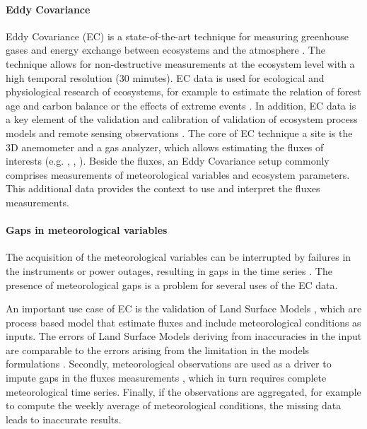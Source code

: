 \documentclass{article}
\begin{document}
\paragraph{Eddy Covariance} Eddy Covariance (EC) is a state-of-the-art technique for measuring greenhouse gases and energy exchange between ecosystems and the atmosphere \cite{aubinet_eddy_2012-1}.  The technique allows for non-destructive measurements at the ecosystem level with a high temporal resolution (30 minutes). EC data is used for ecological and physiological research of ecosystems, for example to estimate the relation of forest age and carbon balance \cite{besnard_quantifying_2018} or the effects of extreme events \cite{mahecha_detecting_2017}. In addition, EC data is a key element of the validation and calibration of validation of ecosystem process models and remote sensing observations \cite{papale_ideas_2020}.
The core of EC technique a site is the 3D anemometer and a gas analyzer, which allows estimating the fluxes of interests (e.g. , , ). Beside the fluxes, an Eddy Covariance setup commonly comprises measurements of meteorological variables and ecosystem parameters. This additional data provides the context to use and interpret the fluxes measurements.

\paragraph{Gaps in meteorological variables} The acquisition of the meteorological variables can be interrupted by failures in the instruments or power outages, resulting in gaps in the time series \cite{aubinet_eddy_2012-1}.
The presence of meteorological gaps is a problem for several uses of the EC data.

An important use case of EC is the validation of Land Surface Models \cite{balzarolo_evaluating_2014, friend_fluxnet_2007-1, bonan_improving_2011-1, kramer_evaluation_2002}, which are process based model that estimate fluxes and include meteorological conditions as inputs. The errors of Land Surface Models deriving from inaccuracies in the input are comparable to the errors arising from the limitation in the models formulations \cite{zhao_how_2012}. 
Secondly, meteorological observations are used as a driver to impute gaps in the fluxes measurements \cite{aubinet_eddy_2012-1}, which in turn requires complete meteorological time series.
Finally, if the observations are aggregated, for example to compute the weekly average of meteorological conditions, the missing data leads to inaccurate results. 
\end{document}

